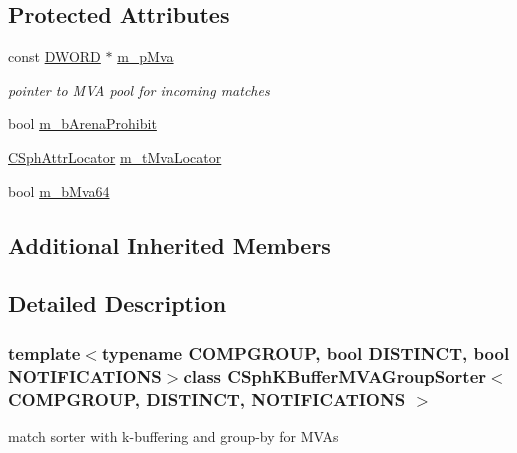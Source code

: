 \subsection*{Protected Attributes}
\begin{DoxyCompactItemize}
\item 
const \hyperlink{sphinxstd_8h_a798af1e30bc65f319c1a246cecf59e39}{D\-W\-O\-R\-D} $\ast$ \hyperlink{classCSphKBufferMVAGroupSorter_a6c5f722befa68c234ed5da3d9b3bbf4e}{m\-\_\-p\-Mva}
\begin{DoxyCompactList}\small\item\em pointer to M\-V\-A pool for incoming matches \end{DoxyCompactList}\item 
bool \hyperlink{classCSphKBufferMVAGroupSorter_ad2096f8141dce39d432d1b7010c103ea}{m\-\_\-b\-Arena\-Prohibit}
\item 
\hyperlink{structCSphAttrLocator}{C\-Sph\-Attr\-Locator} \hyperlink{classCSphKBufferMVAGroupSorter_a50f87adb9205082d6a8539019e5f520a}{m\-\_\-t\-Mva\-Locator}
\item 
bool \hyperlink{classCSphKBufferMVAGroupSorter_a09070d8bc1a08f2653d104198108f1a3}{m\-\_\-b\-Mva64}
\end{DoxyCompactItemize}
\subsection*{Additional Inherited Members}


\subsection{Detailed Description}
\subsubsection*{template$<$typename C\-O\-M\-P\-G\-R\-O\-U\-P, bool D\-I\-S\-T\-I\-N\-C\-T, bool N\-O\-T\-I\-F\-I\-C\-A\-T\-I\-O\-N\-S$>$class C\-Sph\-K\-Buffer\-M\-V\-A\-Group\-Sorter$<$ C\-O\-M\-P\-G\-R\-O\-U\-P, D\-I\-S\-T\-I\-N\-C\-T, N\-O\-T\-I\-F\-I\-C\-A\-T\-I\-O\-N\-S $>$}

match sorter with k-\/buffering and group-\/by for M\-V\-As 


